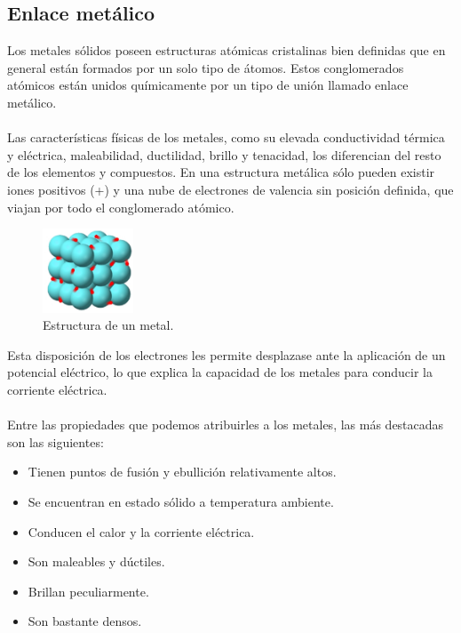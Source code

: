 \documentclass[12pt]{article}
\begin{document}
          \subsection{Enlace metálico}\label{sec:Enlace metálico}
               Los metales sólidos poseen estructuras atómicas cristalinas bien definidas que en general están formados por un solo tipo de átomos. Estos conglomerados atómicos están unidos químicamente por un tipo de unión llamado enlace metálico. \\\\
               Las características físicas de los metales, como su elevada conductividad térmica y eléctrica, maleabilidad, ductilidad, brillo y tenacidad, los diferencian del resto de los elementos y compuestos. En una estructura metálica sólo pueden existir iones positivos (+) y una nube de electrones de valencia sin posición definida, que viajan por todo el conglomerado atómico.

               \begin{figure}[H]
                    \centering
                    \includegraphics[height=2.5cm]{EnlaceMetalico.png}
                    \caption{Estructura de un metal.}
               \end{figure}

               Esta disposición de los electrones les permite desplazase ante la aplicación de un potencial eléctrico, lo que explica la capacidad de los metales para conducir la corriente eléctrica.\\\\
               Entre las propiedades que podemos atribuirles a los metales, las más destacadas son las siguientes:
               
               \begin{itemize}
                    \item Tienen puntos de fusión y ebullición relativamente altos.
                    \item Se encuentran en estado sólido a temperatura ambiente.
                    \item Conducen el calor y la corriente eléctrica.
                    \item Son maleables y dúctiles.
                    \item Brillan peculiarmente.
                    \item Son bastante densos.
               \end{itemize}
\end{document}
